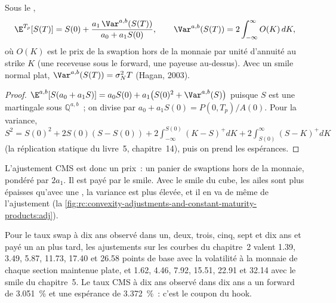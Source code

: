 \begin{proposition}\label{prop:rc:convexity-adjustments-and-constant-maturity-products:cms}
Sous le ,
\[
\E^{T_p}[S(T)] = S(0) + \frac{a_1\,\Var^{a,b}(S(T))}{a_0+a_1S(0)},\qquad
\Var^{a,b}(S(T)) = 2\int_{-\infty}^{\infty} O(K)\,dK,
\]
où $O(K)$ est le prix de la swaption hors de la monnaie par unité d'annuité au strike
$K$ (une receveuse sous le forward, une payeuse au-dessus). Avec un smile normal plat,
$\Var^{a,b}(S(T)) = \sigma_N^2T$ (Hagan, 2003).
\end{proposition}
\begin{proof}
$\E^{a,b}[S(a_0+a_1S)] = a_0S(0) + a_1\bigl(S(0)^2+\Var^{a,b}(S)\bigr)$ puisque $S$ est
une martingale sous $\mathbb Q^{a,b}$~; on divise par $a_0+a_1S(0) = P(0,T_p)/A(0)$. Pour
la variance, $S^2 = S(0)^2 + 2S(0)(S-S(0)) + 2\int_{-\infty}^{S(0)}(K-S)^+dK +
2\int_{S(0)}^{\infty}(S-K)^+dK$ (la réplication statique du livre~5,
chapitre~14), puis on prend les espérances.
\end{proof}

\label{lst:rc:convexity-adjustments-and-constant-maturity-products:cms}

L'ajustement CMS est donc un prix~: un panier de swaptions hors de la monnaie,
pondéré par $2a_1$. Il est payé par le smile. Avec le smile du cube, les ailes
sont plus épaisses qu'avec une , la variance est plus élevée, et il en va de même de l'ajustement
(la \cref{fig:rc:convexity-adjustments-and-constant-maturity-products:adj}).

\begin{example}\label{ex:rc:convexity-adjustments-and-constant-maturity-products:cmsadj}
Pour le taux swap à dix ans observé dans un, deux, trois, cinq, sept et dix
ans et payé un an plus tard, les ajustements sur les courbes du chapitre~2 valent
1.39, 3.49, 5.87, 11.73, 17.40 et 26.58 points de base avec la volatilité à la
monnaie de chaque section maintenue plate, et 1.62, 4.46, 7.92, 15.51, 22.91 et 32.14
avec le smile du chapitre~5. Le taux CMS à dix ans observé dans dix ans a un
forward de 3.051~\% et une espérance de 3.372~\%~: c'est le coupon du hook.
\end{example}


